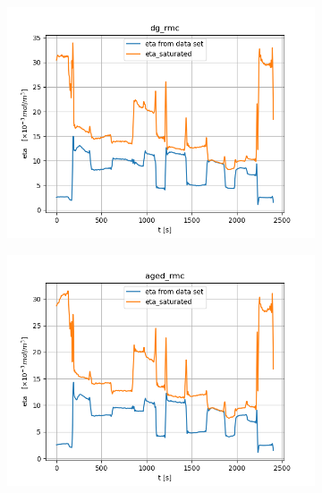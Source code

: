 \begin{figure}[H]
        \begin{minipage}{0.49\textwidth}
                \begin{figure}[H]
                        \centering
                        \includegraphics[width=\textwidth]{./figs/14_figs/bounded_eta_plots/eta_bounds_dg_rmc.png}
                \end{figure}
        \end{minipage}
        \begin{minipage}{0.49\textwidth}
                \begin{figure}[H]
                        \centering
                        \includegraphics[width=\textwidth]{./figs/14_figs/bounded_eta_plots/eta_bounds_aged_rmc.png}
                \end{figure}
        \end{minipage}
\end{figure}

